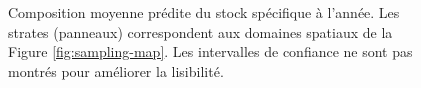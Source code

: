 \begin{figure}[htb]
    \centering
    \caption{Composition moyenne prédite du stock spécifique à l'année. Les strates (panneaux) correspondent aux domaines spatiaux de la Figure \ref{fig:sampling-map}. Les intervalles de confiance ne sont pas montrés pour améliorer la lisibilité.}
    \label{fig:smooth-pred-rec-year}
\end{figure}

